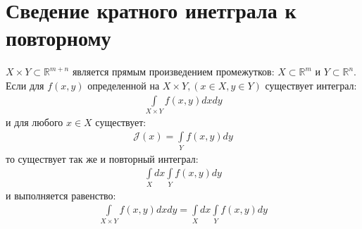\section{Сведение кратного инетграла к повторному}
\begin{theorem}
  $X \times Y \subset \mathbb{R}^{m+n}$ является прямым произведением
  промежутков: $X \subset \mathbb{R}^m$ и $Y \subset \mathbb{R}^n$. \\
  Если для $f(x, y)$ определенной на $X \times Y, (x \in X, y \in Y)$
  существует интеграл:
  \begin{gather}
    \int\limits_{X \times Y} f(x, y) dx dy
    \label{th561:ex1}
  \end{gather}
  и для любого $x \in X$ существует:
  \begin{gather}
    \mathcal{J}(x) = \int\limits_Y f(x, y) dy
    \label{th561:eq1}
  \end{gather}
  то существует так же и повторный интеграл:
  \begin{gather}
    \int\limits_X dx \int\limits_Y f(x, y) dy
    \label{th561:ex2}
  \end{gather}
  и выполняется равенство:
  \begin{gather}
    \int\limits_{X \times Y} f(x, y) dx dy = \int\limits_X dx \int\limits_Y
    f(x, y) dy
    \label{th561:eq2}
  \end{gather}
\end{theorem}

